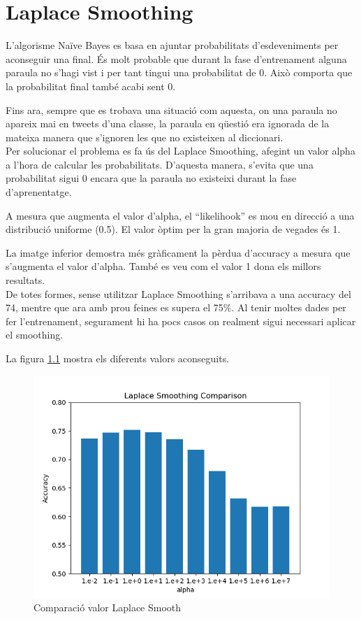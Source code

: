 \chapter{Laplace Smoothing}
L’algorisme Naïve Bayes es basa en ajuntar probabilitats d’esdeveniments per aconseguir una final. És molt probable que durant la fase d’entrenament alguna paraula no s’hagi vist i per tant tingui una probabilitat de 0. Això comporta que la probabilitat final també acabi sent 0. 

Fins ara, sempre que es trobava una situació com aquesta, on una paraula no apareix mai en tweets d’una classe, la paraula en qüestió era ignorada de la mateixa manera que s’ignoren les que no existeixen al diccionari.\\

Per solucionar el problema es fa ús del Laplace Smoothing, afegint un valor alpha a l’hora de calcular les probabilitats. D’aquesta manera, s’evita que una probabilitat sigui 0 encara que la paraula no existeixi durant la fase d’aprenentatge.

A mesura que augmenta el valor d’alpha, el “likelihook” es mou en direcció a una distribució uniforme (0.5). El valor òptim per la gran majoria de vegades és 1. 

La imatge inferior demostra més gràficament la pèrdua d’accuracy a mesura que s’augmenta el valor d’alpha. També es veu com el valor 1 dona els millors resultats.\\

De totes formes, sense utilitzar Laplace Smoothing s’arribava a una accuracy del 74, mentre que ara amb prou feines es supera el 75\%. Al tenir moltes dades per fer l’entrenament, segurament hi ha pocs casos on realment sigui necessari aplicar el smoothing. 

La figura \ref{fig:lap_smooth} mostra els diferents valors aconseguits.

\begin{figure}
    \centering
    \includegraphics[width=\textwidth,height=\textheight,keepaspectratio]{images/image5.png}
    \caption{Comparació valor Laplace Smooth}
    \label{fig:lap_smooth}
\end{figure}
